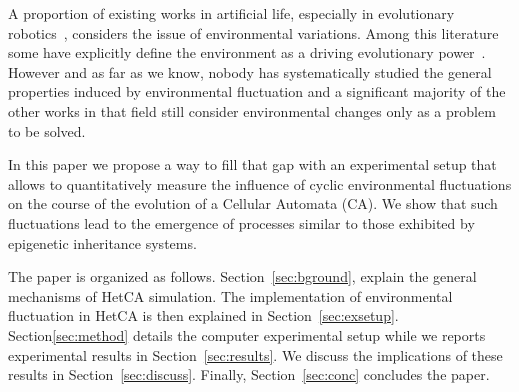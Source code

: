 A proportion of existing works in artificial life, especially in evolutionary robotics~\citep{floreano2000evolutionary}, considers the issue of environmental variations. Among this literature some have explicitly define the environment as a driving evolutionary power~\citep{bredeche2012environmentdrivenopenende}. However and as far as we know, nobody has systematically studied the general properties induced by environmental fluctuation and a significant majority of the other works in that field still consider environmental changes only as a problem to be solved.   %

In this paper we propose a way to fill that gap with an experimental setup that allows to quantitatively measure the influence of cyclic environmental fluctuations on the course of the evolution of a Cellular Automata (CA). We show that such fluctuations lead to the emergence of processes similar to those exhibited by epigenetic inheritance systems.

The paper is organized as follows. Section~\ref{sec:bground}, explain the general mechanisms of HetCA simulation. The implementation of environmental fluctuation in HetCA is then explained in Section~\ref{sec:exsetup}. Section\ref{sec:method} details the computer experimental setup while we reports experimental results in Section~\ref{sec:results}. We discuss the implications of these results in Section~\ref{sec:discuss}. Finally, Section~\ref{sec:conc} concludes the paper.



